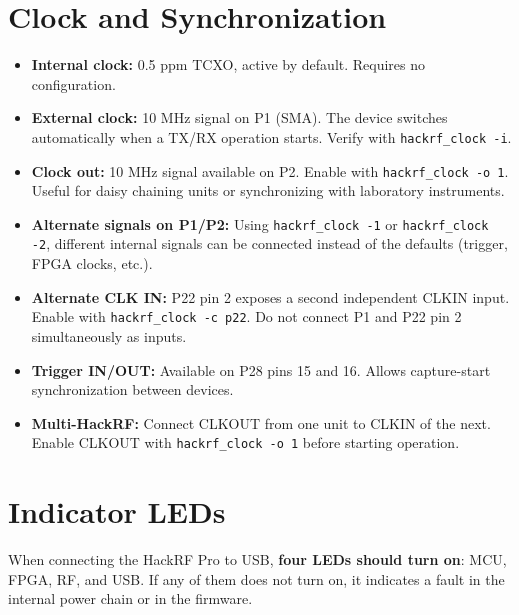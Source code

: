 \documentclass[11pt]{article}
\begin{document}
\section{Clock and Synchronization}

\begin{itemize}
    \item \textbf{Internal clock:} 0.5 ppm TCXO, active by default. Requires no configuration.
    \item \textbf{External clock:} 10 MHz signal on P1 (SMA). The device switches automatically when a TX/RX operation starts. Verify with \texttt{hackrf\_clock -i}.
    \item \textbf{Clock out:} 10 MHz signal available on P2. Enable with \texttt{hackrf\_clock -o 1}. Useful for daisy chaining units or synchronizing with laboratory instruments.
    \item \textbf{Alternate signals on P1/P2:} Using \texttt{hackrf\_clock -1} or \texttt{hackrf\_clock -2}, different internal signals can be connected instead of the defaults (trigger, FPGA clocks, etc.).
    \item \textbf{Alternate CLK IN:} P22 pin 2 exposes a second independent CLKIN input. Enable with \texttt{hackrf\_clock -c p22}. Do not connect P1 and P22 pin 2 simultaneously as inputs.
    \item \textbf{Trigger IN/OUT:} Available on P28 pins 15 and 16. Allows capture-start synchronization between devices.
    \item \textbf{Multi-HackRF:} Connect CLKOUT from one unit to CLKIN of the next. Enable CLKOUT with \texttt{hackrf\_clock -o 1} before starting operation.
\end{itemize}

\section{Indicator LEDs}

When connecting the HackRF Pro to USB, \textbf{four LEDs should turn on}: MCU, FPGA, RF, and USB. If any of them does not turn on, it indicates a fault in the internal power chain or in the firmware.
\end{document}
